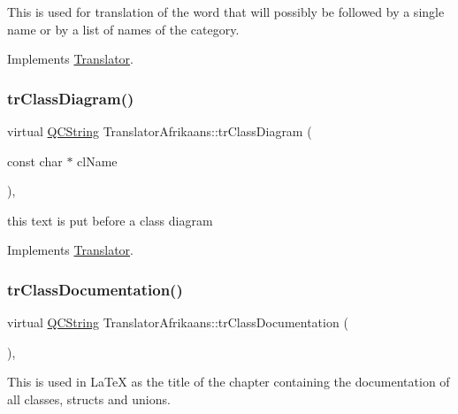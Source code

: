 This is used for translation of the word that will possibly be followed by a single name or by a list of names of the category. 

Implements \mbox{\hyperlink{class_translator}{Translator}}.

\mbox{\label{class_translator_afrikaans_a2149ac4665641fe4283fcf0235c13595}} 
\subsubsection{\texorpdfstring{trClassDiagram()}{trClassDiagram()}}
{\footnotesize\ttfamily virtual \mbox{\hyperlink{class_q_c_string}{Q\+C\+String}} Translator\+Afrikaans\+::tr\+Class\+Diagram (\begin{DoxyParamCaption}\item[{const char $\ast$}]{cl\+Name }\end{DoxyParamCaption})\hspace{0.3cm}{\ttfamily [inline]}, {\ttfamily [virtual]}}

this text is put before a class diagram 

Implements \mbox{\hyperlink{class_translator}{Translator}}.

\mbox{\label{class_translator_afrikaans_adcd285b0edd049a77c4a99ac4afe657d}} 
\subsubsection{\texorpdfstring{trClassDocumentation()}{trClassDocumentation()}}
{\footnotesize\ttfamily virtual \mbox{\hyperlink{class_q_c_string}{Q\+C\+String}} Translator\+Afrikaans\+::tr\+Class\+Documentation (\begin{DoxyParamCaption}{ }\end{DoxyParamCaption})\hspace{0.3cm}{\ttfamily [inline]}, {\ttfamily [virtual]}}

This is used in La\+TeX as the title of the chapter containing the documentation of all classes, structs and unions. 

